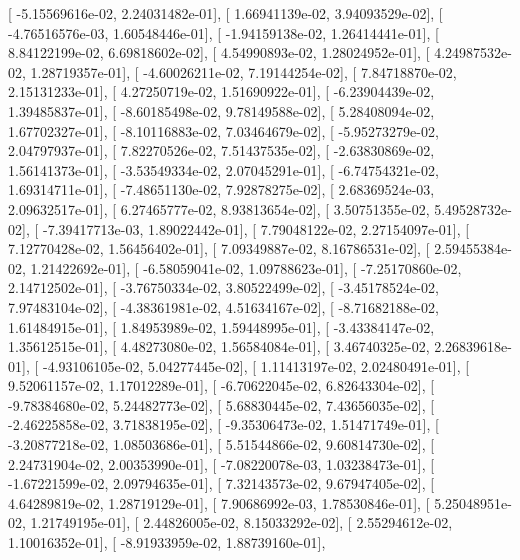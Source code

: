 \documentclass{article}
\begin{document}
       [ -5.15569616e-02,   2.24031482e-01],
       [  1.66941139e-02,   3.94093529e-02],
       [ -4.76516576e-03,   1.60548446e-01],
       [ -1.94159138e-02,   1.26414441e-01],
       [  8.84122199e-02,   6.69818602e-02],
       [  4.54990893e-02,   1.28024952e-01],
       [  4.24987532e-02,   1.28719357e-01],
       [ -4.60026211e-02,   7.19144254e-02],
       [  7.84718870e-02,   2.15131233e-01],
       [  4.27250719e-02,   1.51690922e-01],
       [ -6.23904439e-02,   1.39485837e-01],
       [ -8.60185498e-02,   9.78149588e-02],
       [  5.28408094e-02,   1.67702327e-01],
       [ -8.10116883e-02,   7.03464679e-02],
       [ -5.95273279e-02,   2.04797937e-01],
       [  7.82270526e-02,   7.51437535e-02],
       [ -2.63830869e-02,   1.56141373e-01],
       [ -3.53549334e-02,   2.07045291e-01],
       [ -6.74754321e-02,   1.69314711e-01],
       [ -7.48651130e-02,   7.92878275e-02],
       [  2.68369524e-03,   2.09632517e-01],
       [  6.27465777e-02,   8.93813654e-02],
       [  3.50751355e-02,   5.49528732e-02],
       [ -7.39417713e-03,   1.89022442e-01],
       [  7.79048122e-02,   2.27154097e-01],
       [  7.12770428e-02,   1.56456402e-01],
       [  7.09349887e-02,   8.16786531e-02],
       [  2.59455384e-02,   1.21422692e-01],
       [ -6.58059041e-02,   1.09788623e-01],
       [ -7.25170860e-02,   2.14712502e-01],
       [ -3.76750334e-02,   3.80522499e-02],
       [ -3.45178524e-02,   7.97483104e-02],
       [ -4.38361981e-02,   4.51634167e-02],
       [ -8.71682188e-02,   1.61484915e-01],
       [  1.84953989e-02,   1.59448995e-01],
       [ -3.43384147e-02,   1.35612515e-01],
       [  4.48273080e-02,   1.56584084e-01],
       [  3.46740325e-02,   2.26839618e-01],
       [ -4.93106105e-02,   5.04277445e-02],
       [  1.11413197e-02,   2.02480491e-01],
       [  9.52061157e-02,   1.17012289e-01],
       [ -6.70622045e-02,   6.82643304e-02],
       [ -9.78384680e-02,   5.24482773e-02],
       [  5.68830445e-02,   7.43656035e-02],
       [ -2.46225858e-02,   3.71838195e-02],
       [ -9.35306473e-02,   1.51471749e-01],
       [ -3.20877218e-02,   1.08503686e-01],
       [  5.51544866e-02,   9.60814730e-02],
       [  2.24731904e-02,   2.00353990e-01],
       [ -7.08220078e-03,   1.03238473e-01],
       [ -1.67221599e-02,   2.09794635e-01],
       [  7.32143573e-02,   9.67947405e-02],
       [  4.64289819e-02,   1.28719129e-01],
       [  7.90686992e-03,   1.78530846e-01],
       [  5.25048951e-02,   1.21749195e-01],
       [  2.44826005e-02,   8.15033292e-02],
       [  2.55294612e-02,   1.10016352e-01],
       [ -8.91933959e-02,   1.88739160e-01],
\end{document}
